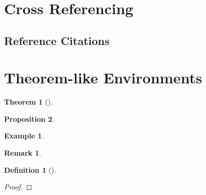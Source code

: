 \documentclass[pdflatex,sn-mathphys-num]{sn-jnl}    %
\theoremstyle{thmstyleone}%
\newtheorem{theorem}{Theorem}%
\newtheorem{proposition}[theorem]{Proposition}%
\theoremstyle{thmstyletwo}%
\newtheorem{example}{Example}%
\newtheorem{remark}{Remark}%
\theoremstyle{thmstylethree}%
\newtheorem{definition}{Definition}%
\begin{document}
\section{Cross Referencing}\label{sec:crossref}

\subsection{Reference Citations}\label{subsec:citations}

\section{Theorem-like Environments}\label{sec:theorems}

\begin{theorem}[]\label{thm:1}

\end{theorem}

\begin{proposition}

\end{proposition}

\begin{example}

\end{example}

\begin{remark}

\end{remark}

\begin{definition}[]

\end{definition}

\begin{proof}

\end{proof}

\end{document}
